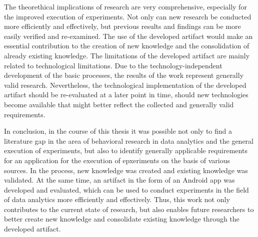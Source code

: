 The theorethical implications of research are very comprehensive, especially for the improved execution of experiments. Not only can new research be conducted more efficiently and effectively, but previous results and findings can be more easily verified and re-examined. The use of the developed artifact would make an essential contribution to the creation of new knowledge and the consolidation of already existing knowledge. The limitations of the developed artifact are mainly related to technological limitations. Due to the technology-independent development of the basic processes, the results of the work represent generally valid research. Nevertheless, the technological implementation of the developed artifact should be re-evaluated at a later point in time, should new technologies become available that might better reflect the collected and generally valid requirements.

In conclusion, in the course of this thesis it was possible not only to find a literature gap in the area of behavioral research in data analytics and the general execution of experiments, but also to identify generally applicable requirements for an application for the execution of epxeriments on the basis of various sources. In the process, new knowledge was created and existing knowledge was validated. At the same time, an artifact in the form of an Android app was developed and evaluated, which can be used to conduct experiments in the field of data analytics more efficiently and effectively. Thus, this work not only contributes to the current state of research, but also enables future researchers to better create new knowledge and consolidate existing knowledge through the developed artifact.







